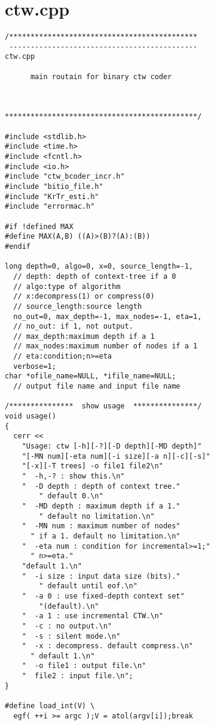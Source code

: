 \section{ctw.cpp}
\begin{verbatim}
/********************************************
 --------------------------------------------
ctw.cpp

      main routain for binary ctw coder



*********************************************/

#include <stdlib.h>
#include <time.h>
#include <fcntl.h>
#include <io.h>
#include "ctw_bcoder_incr.h"
#include "bitio_file.h"
#include "KrTr_esti.h"
#include "errormac.h"

#if !defined MAX
#define MAX(A,B) ((A)>(B)?(A):(B))
#endif

long depth=0, algo=0, x=0, source_length=-1,
  // depth: depth of context-tree if a 0
  // algo:type of algorithm
  // x:decompress(1) or compress(0)
  // source_length:source length
  no_out=0, max_depth=-1, max_nodes=-1, eta=1,
  // no_out: if 1, not output.
  // max_depth:maximum depth if a 1
  // max_nodes:maximum number of nodes if a 1
  // eta:condition;n>=eta
  verbose=1;
char *ofile_name=NULL, *ifile_name=NULL;
  // output file name and input file name

/***************  show usage  ***************/
void usage()
{
  cerr <<
    "Usage: ctw [-h][-?][-D depth][-MD depth]"
    "[-MN num][-eta num][-i size][-a n][-c][-s]"
    "[-x][-T trees] -o file1 file2\n"
    "  -h,-? : show this.\n"
    "  -D depth : depth of context tree."
        " default 0.\n"
    "  -MD depth : maximum depth if a 1."
        " default no limitation.\n"
    "  -MN num : maximum number of nodes"
      " if a 1. default no limitation.\n"
    "  -eta num : condition for incremental>=1;"
      " n>=eta."
    "default 1.\n"
    "  -i size : input data size (bits)."
        " default until eof.\n"
    "  -a 0 : use fixed-depth context set"
        "(default).\n"
    "  -a 1 : use incremental CTW.\n"
    "  -c : no output.\n"
    "  -s : silent mode.\n"
    "  -x : decompress. default compress.\n"
      " default 1.\n"
    "  -o file1 : output file.\n"
    "  file2 : input file.\n";
}

#define load_int(V) \
  egf( ++i >= argc );V = atol(argv[i]);break


\end{verbatim}
